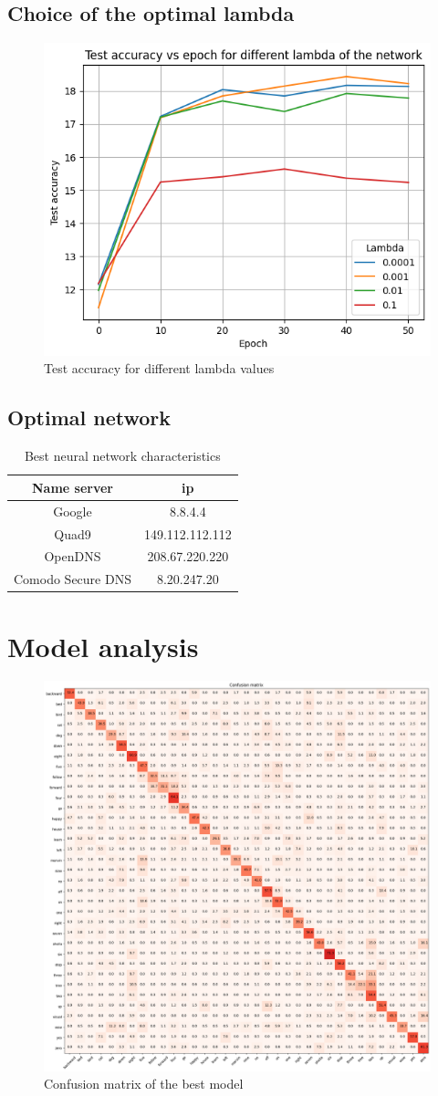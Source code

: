 \documentclass[eng]{class}
\begin{document}
\subsection{Choice of the optimal lambda}

\begin{figure}[h]
  \centering
  \includegraphics[width=.6\columnwidth]{images/lamda.png}
  \caption{Test accuracy for different lambda values}
  \label{fig-4}
\end{figure}
\subsection{Optimal network}
\begin{table}[H]
  \centering
  \begin{tabular}{|c|c|}
    \hline
    \linewidth=0cm
    Name server       & ip              \\
    \hline
    Google            & 8.8.4.4         \\
    Quad9             & 149.112.112.112 \\
    OpenDNS           & 208.67.220.220  \\
    Comodo Secure DNS & 8.20.247.20     \\
    \hline
  \end{tabular}
  \caption{Best neural network characteristics}
  \label{tab-1}
\end{table}
\section{Model analysis}
\begin{figure}[h]
  \centering
  \includegraphics[width=.6\columnwidth]{images/confusion_matrix.png}
  \caption{Confusion matrix of the best model}
  \label{fig-5}
\end{figure}
\end{document}
